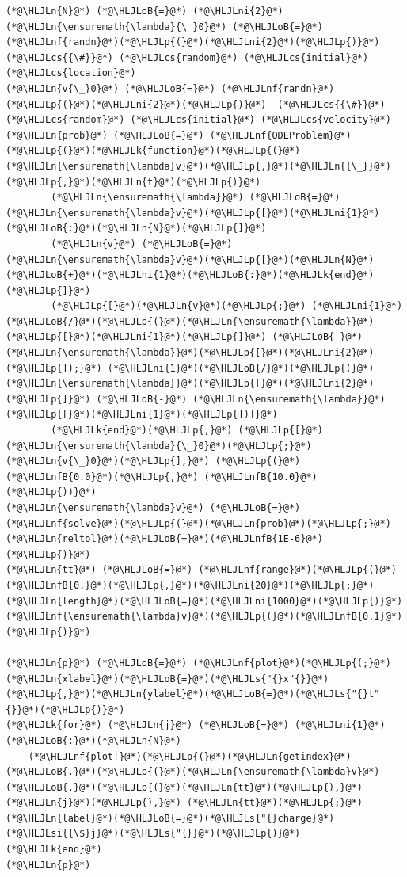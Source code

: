 \documentclass[12pt,a4paper]{article}
\newcommand{\HLJLk}[1]{\textcolor[RGB]{148,91,176}{\textbf{#1}}}
\newcommand{\HLJLn}[1]{#1}
\newcommand{\HLJLnf}[1]{\textcolor[RGB]{66,102,213}{#1}}
\newcommand{\HLJLs}[1]{\textcolor[RGB]{201,61,57}{#1}}
\newcommand{\HLJLsi}[1]{#1}
\newcommand{\HLJLnfB}[1]{\textcolor[RGB]{59,151,46}{#1}}
\newcommand{\HLJLni}[1]{\textcolor[RGB]{59,151,46}{#1}}
\newcommand{\HLJLoB}[1]{\textcolor[RGB]{102,102,102}{\textbf{#1}}}
\newcommand{\HLJLp}[1]{#1}
\newcommand{\HLJLcs}[1]{\textcolor[RGB]{153,153,119}{\textit{#1}}}
\begin{document}
\begin{lstlisting}
(*@\HLJLn{N}@*) (*@\HLJLoB{=}@*) (*@\HLJLni{2}@*)
(*@\HLJLn{\ensuremath{\lambda}{\_}0}@*) (*@\HLJLoB{=}@*) (*@\HLJLnf{randn}@*)(*@\HLJLp{(}@*)(*@\HLJLni{2}@*)(*@\HLJLp{)}@*)  (*@\HLJLcs{{\#}}@*) (*@\HLJLcs{random}@*) (*@\HLJLcs{initial}@*) (*@\HLJLcs{location}@*)
(*@\HLJLn{v{\_}0}@*) (*@\HLJLoB{=}@*) (*@\HLJLnf{randn}@*)(*@\HLJLp{(}@*)(*@\HLJLni{2}@*)(*@\HLJLp{)}@*)  (*@\HLJLcs{{\#}}@*) (*@\HLJLcs{random}@*) (*@\HLJLcs{initial}@*) (*@\HLJLcs{velocity}@*)
(*@\HLJLn{prob}@*) (*@\HLJLoB{=}@*) (*@\HLJLnf{ODEProblem}@*)(*@\HLJLp{(}@*)(*@\HLJLk{function}@*)(*@\HLJLp{(}@*)(*@\HLJLn{\ensuremath{\lambda}v}@*)(*@\HLJLp{,}@*)(*@\HLJLn{{\_}}@*)(*@\HLJLp{,}@*)(*@\HLJLn{t}@*)(*@\HLJLp{)}@*) 
        (*@\HLJLn{\ensuremath{\lambda}}@*) (*@\HLJLoB{=}@*) (*@\HLJLn{\ensuremath{\lambda}v}@*)(*@\HLJLp{[}@*)(*@\HLJLni{1}@*)(*@\HLJLoB{:}@*)(*@\HLJLn{N}@*)(*@\HLJLp{]}@*)
        (*@\HLJLn{v}@*) (*@\HLJLoB{=}@*) (*@\HLJLn{\ensuremath{\lambda}v}@*)(*@\HLJLp{[}@*)(*@\HLJLn{N}@*)(*@\HLJLoB{+}@*)(*@\HLJLni{1}@*)(*@\HLJLoB{:}@*)(*@\HLJLk{end}@*)(*@\HLJLp{]}@*)
        (*@\HLJLp{[}@*)(*@\HLJLn{v}@*)(*@\HLJLp{;}@*) (*@\HLJLni{1}@*)(*@\HLJLoB{/}@*)(*@\HLJLp{(}@*)(*@\HLJLn{\ensuremath{\lambda}}@*)(*@\HLJLp{[}@*)(*@\HLJLni{1}@*)(*@\HLJLp{]}@*) (*@\HLJLoB{-}@*) (*@\HLJLn{\ensuremath{\lambda}}@*)(*@\HLJLp{[}@*)(*@\HLJLni{2}@*)(*@\HLJLp{]);}@*) (*@\HLJLni{1}@*)(*@\HLJLoB{/}@*)(*@\HLJLp{(}@*)(*@\HLJLn{\ensuremath{\lambda}}@*)(*@\HLJLp{[}@*)(*@\HLJLni{2}@*)(*@\HLJLp{]}@*) (*@\HLJLoB{-}@*) (*@\HLJLn{\ensuremath{\lambda}}@*)(*@\HLJLp{[}@*)(*@\HLJLni{1}@*)(*@\HLJLp{])]}@*)
        (*@\HLJLk{end}@*)(*@\HLJLp{,}@*) (*@\HLJLp{[}@*)(*@\HLJLn{\ensuremath{\lambda}{\_}0}@*)(*@\HLJLp{;}@*) (*@\HLJLn{v{\_}0}@*)(*@\HLJLp{],}@*) (*@\HLJLp{(}@*)(*@\HLJLnfB{0.0}@*)(*@\HLJLp{,}@*) (*@\HLJLnfB{10.0}@*)(*@\HLJLp{))}@*)
(*@\HLJLn{\ensuremath{\lambda}v}@*) (*@\HLJLoB{=}@*) (*@\HLJLnf{solve}@*)(*@\HLJLp{(}@*)(*@\HLJLn{prob}@*)(*@\HLJLp{;}@*) (*@\HLJLn{reltol}@*)(*@\HLJLoB{=}@*)(*@\HLJLnfB{1E-6}@*)(*@\HLJLp{)}@*)
(*@\HLJLn{tt}@*) (*@\HLJLoB{=}@*) (*@\HLJLnf{range}@*)(*@\HLJLp{(}@*)(*@\HLJLnfB{0.}@*)(*@\HLJLp{,}@*)(*@\HLJLni{20}@*)(*@\HLJLp{;}@*) (*@\HLJLn{length}@*)(*@\HLJLoB{=}@*)(*@\HLJLni{1000}@*)(*@\HLJLp{)}@*)
(*@\HLJLnf{\ensuremath{\lambda}v}@*)(*@\HLJLp{(}@*)(*@\HLJLnfB{0.1}@*)(*@\HLJLp{)}@*)

(*@\HLJLn{p}@*) (*@\HLJLoB{=}@*) (*@\HLJLnf{plot}@*)(*@\HLJLp{(;}@*)(*@\HLJLn{xlabel}@*)(*@\HLJLoB{=}@*)(*@\HLJLs{"{}x"{}}@*)(*@\HLJLp{,}@*)(*@\HLJLn{ylabel}@*)(*@\HLJLoB{=}@*)(*@\HLJLs{"{}t"{}}@*)(*@\HLJLp{)}@*)
(*@\HLJLk{for}@*) (*@\HLJLn{j}@*) (*@\HLJLoB{=}@*) (*@\HLJLni{1}@*)(*@\HLJLoB{:}@*)(*@\HLJLn{N}@*)
    (*@\HLJLnf{plot!}@*)(*@\HLJLp{(}@*)(*@\HLJLn{getindex}@*)(*@\HLJLoB{.}@*)(*@\HLJLp{(}@*)(*@\HLJLn{\ensuremath{\lambda}v}@*)(*@\HLJLoB{.}@*)(*@\HLJLp{(}@*)(*@\HLJLn{tt}@*)(*@\HLJLp{),}@*)(*@\HLJLn{j}@*)(*@\HLJLp{),}@*) (*@\HLJLn{tt}@*)(*@\HLJLp{;}@*) (*@\HLJLn{label}@*)(*@\HLJLoB{=}@*)(*@\HLJLs{"{}charge}@*) (*@\HLJLsi{{\$}j}@*)(*@\HLJLs{"{}}@*)(*@\HLJLp{)}@*)
(*@\HLJLk{end}@*)
(*@\HLJLn{p}@*)
\end{lstlisting}
\end{document}
